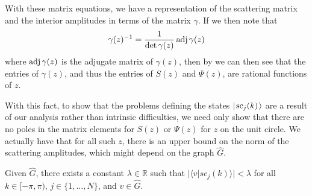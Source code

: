 \documentclass[../thesis-main/thesis-main]{subfiles}
\begin{document}
With these matrix equations, we have a representation of the scattering matrix and the interior amplitudes in terms of the matrix $\gamma$.  If we then note that
\begin{equation}
  \gamma(z)^{-1} = \frac{1}{\det \gamma(z)} \operatorname{adj} \gamma (z)
\end{equation}
where $\operatorname{adj} \gamma (z)$ is the adjugate matrix of $\gamma(z)$, then by  we can then see that the entries of $\gamma(z)$, and thus the entries of $S(z)$ and $\Psi(z)$, are rational functions of $z$. 

With this fact, to show that the problems defining the states $|\mspace{2mu} \text{sc}_j(k) \mspace{2mu} \rangle$ are a result of our analysis rather than intrinsic difficulties, we need only show that there are no poles in the matrix elements for $S(z)$ or $\Psi(z)$ for $z$ on the unit circle.  We actually have that for all such $z$, there is an upper bound on the norm of the scattering amplitudes, which might depend on the graph $\widehat{G}$.
\begin{lemma}
Given $\widehat{G}$, there exists a constant $\lambda\in\mathbb{R}$ such that $|\langle v|sc_{j}(k)\rangle|<\lambda$ for all $k\in[-\pi,\pi)$, $j\in\{1,\ldots,N\}$, and $v\in\widehat{G}$.
\end{lemma}\label{lem:scattering_state_amplitude_bound}
\end{document}
